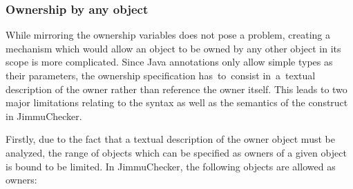 \documentclass{pracamgr}
\theoremstyle{break}
\theoremstyle{break}
\theoremstyle{break}
\begin{document}
\subsubsection{Ownership by any object}

While mirroring the ownership variables does not pose a problem,
creating a mechanism which would allow an object to be owned by any
other object in its scope is more complicated. Since Java annotations
only allow simple types as their parameters, the ownership
specification has~to~consist in~a~textual description of the owner
rather than reference the owner itself. This leads to two major
limitations relating to the syntax as well as the semantics of the
construct in JimmuChecker.

Firstly, due to the fact that a textual description of the owner
object must be analyzed, the range of objects which can be specified
as owners of a given object is bound to be limited. In JimmuChecker,
the following objects are allowed as owners:
\end{document}
